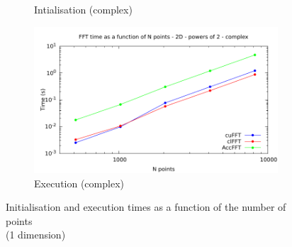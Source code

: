 \documentclass[12pt, a4paper]{article}
\begin{document}
\begin{figure}[H]
\begin{subfigure}{.5\textwidth}
\caption{Intialisation (complex)}
\label{FFTPOW21DCI}
\end{subfigure}%
\begin{subfigure}{.5\textwidth}
\centering
\includegraphics[width=.9\linewidth]{graphs/fft-2d-pow2-c-exec.pdf}
\caption{Execution (complex)}
\label{FFTPOW21DCE}
\end{subfigure}
\caption{Initialisation and execution times as a function of the number of points\\(1 dimension)}
\label{FFTPOW21D}
\end{figure}
\end{document}
